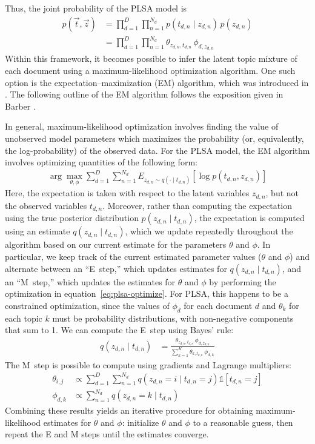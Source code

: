 \documentclass{article}
\newcommand{\indicator}{\mathds{1}}
\begin{document}
Thus, the joint probability of the PLSA model is
\begin{align}
p(\vec{t}, \vec{z})
&= \prod_{d=1}^D \prod_{n=1}^{N_d} p(t_{d,n} \mid z_{d,n}) \, p(z_{d,n}) \\
&= \prod_{d=1}^D \prod_{n=1}^{N_d} \theta_{z_{d,n}, t_{d,n}} \, \phi_{d, z_{d,n}}
\end{align}
Within this framework, it becomes possible to infer the latent topic mixture of each document using a maximum-likelihood optimization algorithm.
One such option is the expectation--maximization (EM) algorithm, which was introduced in \cite{dempster1977em}.
The following outline of the EM algorithm follows the exposition given in Barber \cite{barber2012bayesian}.

In general, maximum-likelihood optimization involves finding the value of unobserved model parameters which maximizes the probability (or, equivalently, the log-probability) of the observed data.
For the PLSA model, the EM algorithm involves optimizing quantities of the following form:
\begin{align}
\arg\max_{\theta, \phi} \sum_{d=1}^D \sum_{n=1}^{N_d} E_{z_{d,n} \sim q(\cdot \mid t_{d,n})} \left[ \log p(t_{d,n}, z_{d,n}) \right]
\label{eq:plsa-optimize}
\end{align}
Here, the expectation is taken with respect to the latent variables $z_{d,n}$, but not the observed variables $t_{d,n}$.
Moreover, rather than computing the expectation using the true posterior distribution ${p(z_{d,n} \mid t_{d,n})}$, the expectation is computed using an estimate ${q(z_{d,n} \mid t_{d,n})}$, which we update repeatedly throughout the algorithm based on our current estimate for the parameters $\theta$ and $\phi$.
In particular, we keep track of the current estimated parameter values ($\theta$ and $\phi$) and alternate between an ``E~step,'' which updates estimates for ${q(z_{d,n} \mid t_{d,n})}$, and an ``M~step,'' which updates the estimates for $\theta$ and $\phi$ by performing the optimization in equation~\eqref{eq:plsa-optimize}.
For PLSA, this happens to be a constrained optimization, since the values of $\phi_d$ for each document $d$ and $\theta_k$ for each topic $k$ must be probability distributions, with non-negative components that sum to 1.
We can compute the E~step using Bayes' rule:
\begin{align}
q(z_{d,n} \mid t_{d,n})
&= \frac{\theta_{z_{d,n}, t_{d,n}} \, \phi_{d, z_{d,n}}}
        {\sum_{k=1}^K \theta_{k, t_{d,n}} \, \phi_{d, k}}
\end{align}
The M~step is possible to compute using gradients and Lagrange multipliers:
\begin{align}
\theta_{i,j} &\propto \sum_{d=1}^D \sum_{n=1}^{N_d} q(z_{d,n} = i \mid t_{d,n} = j) \indicator [t_{d,n} = j] \\
\phi_{d,k} &\propto \sum_{n=1}^{N_d} q(z_{d,n} = k \mid t_{d,n})
\end{align}
Combining these results yields an iterative procedure for obtaining maximum-likelihood estimates for $\theta$ and $\phi$:
initialize $\theta$ and $\phi$ to a reasonable guess, then repeat the E and M steps until the estimates converge.
\end{document}
